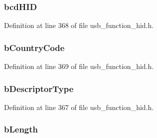\subsubsection[{bcd\+H\+I\+D}]{ bcd\+H\+I\+D}\label{struct___u_s_b___h_i_d___d_s_c_a778de625dce37d7d465fb940d186e9c8}


Definition at line 368 of file usb\+\_\+function\+\_\+hid.\+h.

\hypertarget{struct___u_s_b___h_i_d___d_s_c_a0f6a8b12c7021b10aec7da41d61f2547}{}
\subsubsection[{b\+Country\+Code}]{ b\+Country\+Code}\label{struct___u_s_b___h_i_d___d_s_c_a0f6a8b12c7021b10aec7da41d61f2547}


Definition at line 369 of file usb\+\_\+function\+\_\+hid.\+h.

\hypertarget{struct___u_s_b___h_i_d___d_s_c_ac1d02ce6fe165032044fb81602a9b07c}{}
\subsubsection[{b\+Descriptor\+Type}]{ b\+Descriptor\+Type}\label{struct___u_s_b___h_i_d___d_s_c_ac1d02ce6fe165032044fb81602a9b07c}


Definition at line 367 of file usb\+\_\+function\+\_\+hid.\+h.

\hypertarget{struct___u_s_b___h_i_d___d_s_c_a8e443464272fdf3bd5148df0b7f5dcaf}{}
\subsubsection[{b\+Length}]{ b\+Length}\label{struct___u_s_b___h_i_d___d_s_c_a8e443464272fdf3bd5148df0b7f5dcaf}


